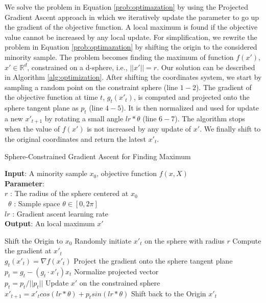 We solve the problem in Equation \ref{prob:optimazation} by using the Projected Gradient Ascent approach in which we iteratively update the parameter to go up the gradient of the objective function. A local maximum is found if the objective value cannot be increased by any local update. For simplification, we rewrite the problem in Equation \ref{prob:optimazation} by shifting the origin to the considered minority sample. The problem becomes finding the maximum of function $f(x')$, $x' \in \mathbb{R}^d$, constrained on a d-sphere, i.e., $||x'||=r$. Our solution can be described in Algorithm \ref{alg:optimization}. After shifting the coordinates system, we start by sampling a random point on the constraint sphere (line $1-2$). The gradient of the objective function at time $t$, $g_t(x'_t)$, is computed and projected onto the sphere tangent plane as $p_t$ (line $4-5$). It is then normalized and used for update a new $x'_{t+1}$ by rotating a small angle $lr*\theta$ (line $6-7$). The algorithm stops when the value of $f(x')$ is not increased by any update of $x'$. We finally shift to the original coordinates and return the latest $x'_t$.   
\begin{algorithm}[ht]
	\caption{Sphere-Constrained Gradient Ascent for Finding Maximum}
	
	\begin{flushleft}
		\textbf{Input}: A minority sample $x_0$, objective function $f(x,X)$\\
		\textbf{Parameter}: \\
		$r$ : The radius of the sphere centered at $x_0$  \\\
		$\theta$ : Sample space $\theta \in [0,2\pi]$ \\
		$lr$ : Gradient ascent learning rate\\
		
		\textbf{Output}: An local maximum $x'$\\
		\begin{algorithmic}[1]
			\STATE Shift the Origin to $x_0$
			\STATE Randomly initiate $x'_t$ on the sphere with radius $r$	
			\STATE Compute the gradient at $x'_t$\\
			$g_t(x'_t) = \nabla f(x'_t)$
			\STATE Project the gradient onto the sphere tangent plane\\
			$p_t = g_t - (g_t \cdot x'_t) x_t$
			\STATE Normalize projected vector\\
			$p_t = p_t/ ||p_t||$
			\STATE Update $x'$ on the constrained sphere \\
			$x'_{t+1} = x'_t cos(lr*\theta) + p_t sin (lr*\theta)$ 			
			\ENDWHILE
			\STATE Shift back to the Origin
			\RETURN $x'_t$
		\end{algorithmic}
	\end{flushleft}
	\label{alg:optimization}
\end{algorithm}


